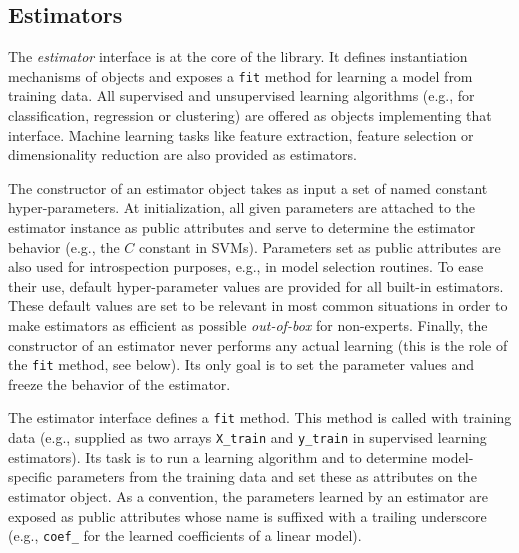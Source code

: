 \documentclass{llncs}
\begin{document}
\subsection{Estimators}
\label{sec:estimators}

The \textit{estimator} interface is at the core of the
library. It defines instantiation mechanisms of objects and exposes a
\texttt{fit} method for learning a model from training data.  All supervised and
unsupervised learning algorithms (e.g., for classification, regression or
clustering) are offered as objects implementing that interface. Machine
learning tasks like feature extraction, feature selection or dimensionality
reduction are also provided as estimators.

The constructor of an estimator object takes as input a set of named constant
hyper-parameters. At initialization, all given parameters are attached to the
estimator instance as public attributes and serve to determine the estimator
behavior (e.g., the $C$ constant in SVMs). Parameters set as public attributes
are also used for introspection purposes, e.g., in model selection routines. To
ease their use, default hyper-parameter values are provided for all built-in
estimators. These default values are set to be relevant in most common
situations in order to make estimators as efficient as possible
\textit{out-of-box} for non-experts. Finally, the constructor of an estimator
never performs any actual learning (this is the role of the \texttt{fit} method,
see below).  Its only goal is to set the parameter values and freeze the
behavior of the estimator.

The estimator interface defines a \texttt{fit} method. This method is called
with training data (e.g., supplied as two arrays \texttt{X\_train} and
\texttt{y\_train} in supervised learning estimators). Its task is to run a
learning algorithm and to determine model- specific parameters from the training
data and set these as attributes on the estimator object. As a convention, the
parameters learned by an estimator are exposed as public attributes whose name
is suffixed with a trailing underscore (e.g., \texttt{coef\_} for the
learned coefficients of a linear model).
\end{document}
